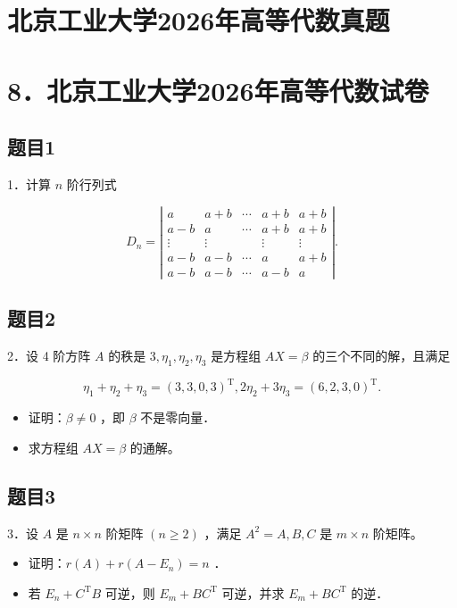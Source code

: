 \documentclass{article}
\begin{document}
\section*{北京工业大学2026年高等代数真题}
\section*{8．北京工业大学2026年高等代数试卷}

\subsection{题目1}
1．计算 \(n\) 阶行列式

\[
D_{n}=\left|\begin{array}{ccccc}
a & a+b & \cdots & a+b & a+b \\
a-b & a & \cdots & a+b & a+b \\
\vdots & \vdots & & \vdots & \vdots \\
a-b & a-b & \cdots & a & a+b \\
a-b & a-b & \cdots & a-b & a
\end{array}\right| .
\]

\subsection{题目2}
2．设 4 阶方阵 \(A\) 的秩是 \(3, \eta_{1}, \eta_{2}, \eta_{3}\) 是方程组 \(A X=\beta\) 的三个不同的解，且满足

\[
\eta_{1}+\eta_{2}+\eta_{3}=(3,3,0,3)^{\mathrm{T}}, 2 \eta_{2}+3 \eta_{3}=(6,2,3,0)^{\mathrm{T}} .
\]

\begin{itemize}
  \item[（1）] 证明：\(\beta \neq 0\) ，即 \(\beta\) 不是零向量．
  \item[（2）] 求方程组 \(A X=\beta\) 的通解。
\end{itemize}

\subsection{题目3}
3．设 \(A\) 是 \(n \times n\) 阶矩阵 \((n \geq 2)\) ，满足 \(A^{2}=A, B, C\) 是 \(m \times n\) 阶矩阵。

\begin{itemize}
  \item[（1）] 证明：\(r(A)+r\left(A-E_{n}\right)=n\) ．
  \item[（2）] 若 \(E_{n}+C^{\mathrm{T}} B\) 可逆，则 \(E_{m}+B C^{\mathrm{T}}\) 可逆，并求 \(E_{m}+B C^{\mathrm{T}}\) 的逆．
\end{itemize}
\end{document}

